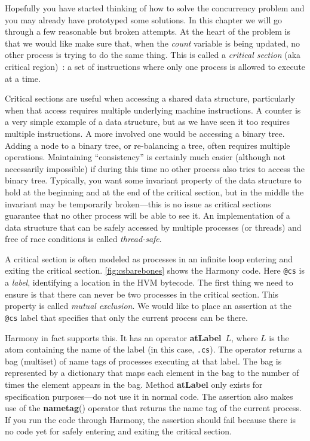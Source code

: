 \documentclass{report}
\begin{document}
Hopefully you have started thinking of how to solve the concurrency
problem and you may already have prototyped some solutions.
In this chapter we will go through a few reasonable but broken attempts.
At the heart of the problem is that we would like make sure that, when
the \textit{count} variable is being updated, no other process is
trying to do the same thing.  This is called a \emph{critical section}
(aka critical region)~\cite{EWD123}:
a set of instructions where only one process is allowed to execute at a
time.
%
%

%
%

Critical sections are useful when accessing a shared data
structure, particularly when that access requires multiple underlying
machine instructions.  A counter is a very simple example of
a data structure, but as we have seen it too requires multiple instructions.
A more involved one would be accessing a binary tree.
Adding a node to a binary tree, or re-balancing a tree, often requires
multiple operations.  Maintaining ``consistency'' is certainly much easier
(although not necessarily impossible) if during this time no other
process also tries to access the binary tree.
Typically, you want some invariant property of the data structure to hold
at the beginning and at the end of the critical section, but in the middle
the invariant may be temporarily broken---this is no issue as critical
sections guarantee that no other
process will be able to see it.
An implementation of a data structure that can be safely accessed by multiple
processes (or threads) and free of race conditions is called \emph{thread-safe}.
%
%

%

A critical section is often modeled as processes in an infinite loop
entering and exiting the critical section.
\autoref{fig:csbarebones} shows the Harmony code.
Here \texttt{@cs} is a \emph{label},
%
identifying a location in the HVM bytecode.  The first thing we need to
ensure is that there can never be two processes in the critical section.
This property is called \emph{mutual exclusion}.
%
We would like to place an assertion at the \texttt{@cs} label that
specifies that only the current process can be there.

Harmony in fact supports this.
It has an operator \textbf{atLabel}~$L$,
%
where $L$
is the atom containing the name of the label (in this case, \texttt{.cs}).
The operator returns a bag (multiset) of name tags of processes executing at that
label.  The bag is represented by a dictionary that maps each element
in the bag to the number of times the element appears in the bag.
Method \textbf{atLabel} only exists for specification purposes---do not
use it in normal code.
The assertion also makes use of the \textbf{nametag}() operator
%
that returns the name tag of the current process.
If you run the code through Harmony, the assertion should fail because
there is no code yet for safely entering and exiting the critical section.
\end{document}
